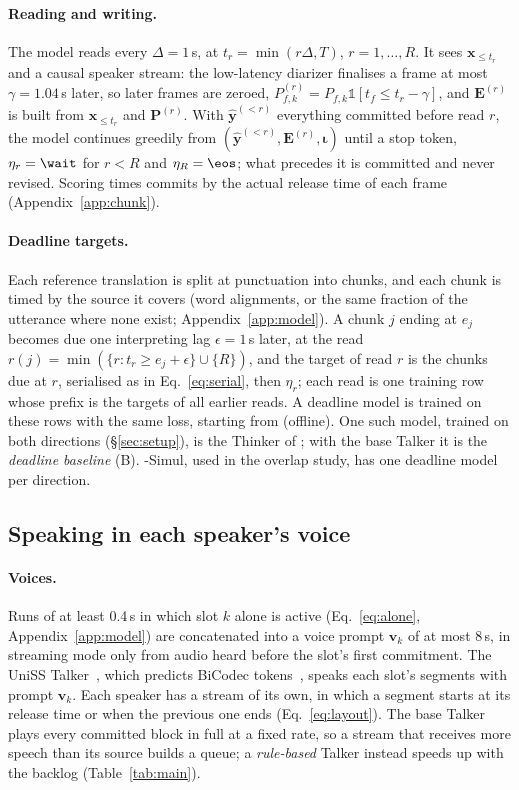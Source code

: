 \paragraph{Reading and writing.} The model reads every $\Delta=1$\,s, at $t_r=\min(r\Delta,T)$, $r=1,\dots,R$. It sees
$\bm{x}_{\le t_r}$ and a causal speaker stream: the low-latency diarizer finalises a frame at most $\gamma=1.04$\,s later,
so later frames are zeroed, $P^{(r)}_{f,k}=P_{f,k}\mathds{1}[t_f\le t_r-\gamma]$, and $\bm{E}^{(r)}$ is built from
$\bm{x}_{\le t_r}$ and $\bm{P}^{(r)}$. With $\hat{\bm{y}}^{(<r)}$ everything committed
before read $r$, the model continues greedily from $(\hat{\bm{y}}^{(<r)},\bm{E}^{(r)},\bm{\iota})$ until a stop
token, $\eta_r=\wait$ for $r<R$ and $\eta_R=\eos$; what precedes it is committed and never revised. Scoring times
commits by the actual release time of each frame (Appendix~\ref{app:chunk}).

\paragraph{Deadline targets.} Each reference translation is split at punctuation into chunks, and each chunk is timed by
the source it covers (word alignments, or the same fraction of the utterance where none exist; Appendix~\ref{app:model}).
A chunk $j$ ending at $e_j$ becomes due one interpreting lag $\epsilon=1$\,s later, at the read
$r(j)=\min(\{r: t_r\ge e_j+\epsilon\}\cup\{R\})$, and the target of read $r$ is the chunks due at $r$, serialised as in Eq.~\eqref{eq:serial}, then $\eta_r$; each read is
one training row whose prefix is the targets of all earlier reads. A deadline model is trained on these rows with the
same loss, starting from \sys{} (offline). One such model,
trained on both directions (\S\ref{sec:setup}), is the Thinker of \sys{}; with the base Talker it is the
\emph{deadline baseline} (B). \sys{}-Simul, used in the overlap study, has one deadline model per direction.

\subsection{Speaking in each speaker's voice}
\label{sec:method-voice}

\paragraph{Voices.} Runs of at least 0.4\,s in which slot $k$ alone is active (Eq.~\eqref{eq:alone},
Appendix~\ref{app:model}) are concatenated into a voice prompt $\bm{v}_k$ of at most 8\,s, in streaming mode only from
audio heard before the slot's first commitment. The UniSS Talker~\citep{uniss2025}, which predicts BiCodec
tokens~\citep{wang2025spark}, speaks each slot's segments with prompt $\bm{v}_k$. Each speaker has a stream of its own,
in which a segment starts at its release time or when the previous one ends (Eq.~\eqref{eq:layout}). The base Talker
plays every committed block in full at a fixed rate, so a stream that receives more speech than its source builds a
queue; a \emph{rule-based} Talker instead speeds up with the backlog (Table~\ref{tab:main}).

